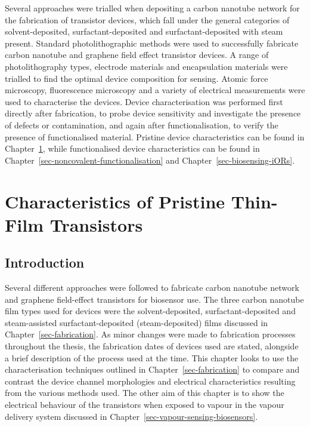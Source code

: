\documentclass[
  a4paper,
]{scrbook}
\begin{document}
Several approaches were trialled when depositing a carbon nanotube
network for the fabrication of transistor devices, which fall under the
general categories of solvent-deposited, surfactant-deposited and
surfactant-deposited with steam present. Standard photolithographic
methods were used to successfully fabricate carbon nanotube and graphene
field effect transistor devices. A range of photolithography types,
electrode materials and encapsulation materials were trialled to find
the optimal device composition for sensing. Atomic force microscopy,
fluorescence microscopy and a variety of electrical measurements were
used to characterise the devices. Device characterisation was performed
first directly after fabrication, to probe device sensitivity and
investigate the presence of defects or contamination, and again after
functionalisation, to verify the presence of functionalised material.
Pristine device characteristics can be found in
Chapter~\ref{sec-pristine-characteristics}, while functionalised device
characteristics can be found in
Chapter~\ref{sec-noncovalent-functionalisation} and
Chapter~\ref{sec-biosensing-iORs}.


\hypertarget{sec-pristine-characteristics}{%
\chapter{Characteristics of Pristine Thin-Film
Transistors}\label{sec-pristine-characteristics}}

\hypertarget{introduction-3}{%
\section{Introduction}\label{introduction-3}}

Several different approaches were followed to fabricate carbon nanotube
network and graphene field-effect transistors for biosensor use. The
three carbon nanotube film types used for devices were the
solvent-deposited, surfactant-deposited and steam-assisted
surfactant-deposited (steam-deposited) films discussed in
Chapter~\ref{sec-fabrication}. As minor changes were made to fabrication
processes throughout the thesis, the fabrication dates of devices used
are stated, alongside a brief description of the process used at the
time. This chapter looks to use the characterisation techniques outlined
in Chapter~\ref{sec-fabrication} to compare and contrast the device
channel morphologies and electrical characteristics resulting from the
various methods used. The other aim of this chapter is to show the
electrical behaviour of the transistors when exposed to vapour in the
vapour delivery system discussed in
Chapter~\ref{sec-vapour-sensing-biosensors}.
\end{document}
